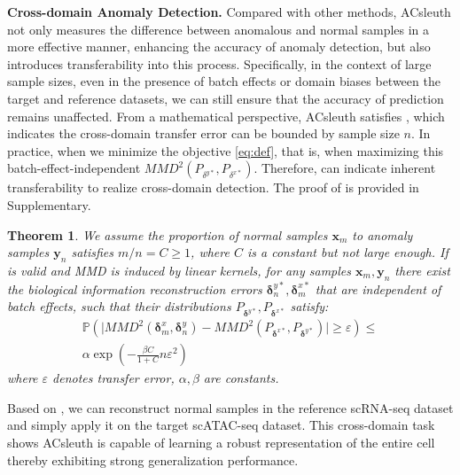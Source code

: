 \documentclass{article}
\newtheorem{theorem}{Theorem}[section]
\begin{document}
\textbf{Cross-domain Anomaly Detection.} 
Compared with other methods, ACsleuth not only measures the difference between anomalous and normal samples in a more effective manner,
enhancing the accuracy of anomaly detection, but also introduces transferability into this process.
Specifically, in the context of large sample sizes, even in the presence of batch effects or domain biases between the target and reference datasets,
we can still ensure that the accuracy of prediction remains unaffected. 
From a mathematical perspective, ACsleuth satisfies , which indicates the cross-domain transfer error can be bounded by sample size $n$.
In practice, when we minimize the objective \eqref{eq:def}, that is, when maximizing this batch-effect-independent $MMD^2\left(P_{\delta^{y*}}, P_{\delta^{x*}}\right)$.
Therefore,  can indicate inherent transferability to realize cross-domain detection.
The proof of  is provided in Supplementary.
\begin{theorem}\label{th:trans}
We assume the proportion of normal samples $\bm{x}_m$ to anomaly samples $\bm{y}_n$ satisfies $m/n = C \geq 1$, where $C$ is a constant but not large enough.
If  is valid and MMD is induced by linear kernels, for any samples $\bm{x}_m, \bm{y}_n$
there exist the biological information reconstruction errors $\bm{\delta}_n^{y*}, \bm{\delta}_m^{x*}$ that are independent of batch effects, such that their distributions $P_{\bm{\delta}^{y*}}, P_{\bm{\delta}^{x*}}$ satisfy:
\begin{multline}
    \mathbb{P}\left(\big| MMD^2(\bm{\delta}_m^x, \bm{\delta}_n^y) - MMD^2(P_{\bm{\delta}^{x*}}, P_{\bm{\delta}^{y*}}) \big| \geq \varepsilon \right) \leq \\
    \alpha \exp\left(-\frac{\beta C}{1+C}n\varepsilon^2\right)
\end{multline}
where $\varepsilon$ denotes transfer error, $\alpha, \beta$ are constants.
\end{theorem}
Based on , we can reconstruct normal samples in the reference scRNA-seq dataset 
and simply apply it on the target scATAC-seq dataset. 
This cross-domain task shows ACsleuth is capable of learning a robust representation of the entire cell thereby exhibiting strong 
generalization performance.
\end{document}
